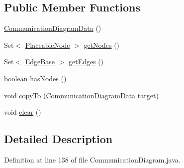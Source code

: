 \subsection*{Public Member Functions}
\begin{DoxyCompactItemize}
\item 
\hyperlink{classorg_1_1tzi_1_1use_1_1gui_1_1views_1_1diagrams_1_1behavior_1_1communicationdiagram_1_1_commufbba68d0542edec6da2ea3d0e02dfce8_ade01ce2df2e26c010d00df8387e5e9a0}{Communication\-Diagram\-Data} ()
\item 
Set$<$ \hyperlink{classorg_1_1tzi_1_1use_1_1gui_1_1views_1_1diagrams_1_1elements_1_1_placeable_node}{Placeable\-Node} $>$ \hyperlink{classorg_1_1tzi_1_1use_1_1gui_1_1views_1_1diagrams_1_1behavior_1_1communicationdiagram_1_1_commufbba68d0542edec6da2ea3d0e02dfce8_af080e8eee846c2f49d2b71136fe085d8}{get\-Nodes} ()
\item 
Set$<$ \hyperlink{classorg_1_1tzi_1_1use_1_1gui_1_1views_1_1diagrams_1_1elements_1_1edges_1_1_edge_base}{Edge\-Base} $>$ \hyperlink{classorg_1_1tzi_1_1use_1_1gui_1_1views_1_1diagrams_1_1behavior_1_1communicationdiagram_1_1_commufbba68d0542edec6da2ea3d0e02dfce8_ac67ace76aa4995868cd75380d8042b88}{get\-Edges} ()
\item 
boolean \hyperlink{classorg_1_1tzi_1_1use_1_1gui_1_1views_1_1diagrams_1_1behavior_1_1communicationdiagram_1_1_commufbba68d0542edec6da2ea3d0e02dfce8_ac261066c3d193ee5dec22624bab0d9c1}{has\-Nodes} ()
\item 
void \hyperlink{classorg_1_1tzi_1_1use_1_1gui_1_1views_1_1diagrams_1_1behavior_1_1communicationdiagram_1_1_commufbba68d0542edec6da2ea3d0e02dfce8_a3612f86258024b24740379834867f102}{copy\-To} (\hyperlink{classorg_1_1tzi_1_1use_1_1gui_1_1views_1_1diagrams_1_1behavior_1_1communicationdiagram_1_1_commufbba68d0542edec6da2ea3d0e02dfce8}{Communication\-Diagram\-Data} target)
\item 
void \hyperlink{classorg_1_1tzi_1_1use_1_1gui_1_1views_1_1diagrams_1_1behavior_1_1communicationdiagram_1_1_commufbba68d0542edec6da2ea3d0e02dfce8_ad6567f780781716ea0ccf449ec8873fe}{clear} ()
\end{DoxyCompactItemize}


\subsection{Detailed Description}


Definition at line 138 of file Communication\-Diagram.\-java.



